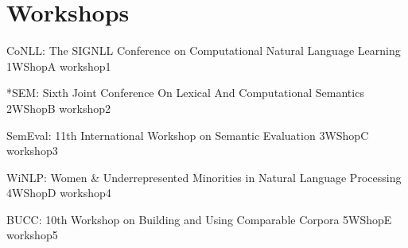 \chapter[Workshops: \daydate]{Workshops}
\thispagestyle{emptyheader}
\vfill





\begin{wsschedule}
  {CoNLL: The SIGNLL Conference on Computational Natural Language Learning}
  {1}{WShopA}
  {workshop1}
  {\WShopLocA}
  
\end{wsschedule}

\begin{wsschedule}
  {*SEM: Sixth Joint Conference On Lexical And Computational Semantics}
  {2}{WShopB}
  {workshop2}
  {\WShopLocB}
  
\end{wsschedule}

\begin{wsschedule}
  {SemEval: 11th International Workshop on Semantic Evaluation}
  {3}{WShopC}
  {workshop3}
  {\WShopLocC}
  
\end{wsschedule}



\begin{wsschedule}
  {WiNLP: Women \& Underrepresented Minorities in Natural Language Processing}
  {4}{WShopD}
  {workshop4}
  {\WShopLocD}
  
\end{wsschedule}


\begin{wsschedule}
  {BUCC: 10th Workshop on Building and Using Comparable Corpora}
  {5}{WShopE}
  {workshop5}
  {\WShopLocE}
  
\end{wsschedule}

